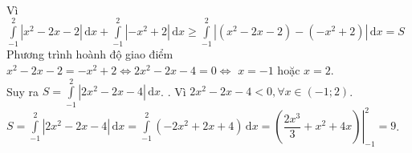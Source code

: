 \begin{ex}
{\begin{itemchoice}
			\\
			Vì $\displaystyle\int\limits_{-1}^{2} \left|x^2 -2x -2\right|\mathrm{\,d}x+
			\displaystyle\int\limits_{-1}^{2} \left|-x^2 + 2\right|\mathrm{\,d}x\ge
			\displaystyle\int\limits_{-1}^{2} \left|(x^2 -2x -2)- (-x^2 + 2) \right|\mathrm{\,d}x=S$
			Phương trình hoành độ giao điểm\\
			$ x^2 -2x -2 = -x^2 +2 \Leftrightarrow
			2x^2 -2x - 4 = 0 \Leftrightarrow $ $x= -1$ hoặc $x=2$.\\
			Suy ra $S= \displaystyle\int\limits_{-1}^{2} \left|2x^2 -2x - 4\right|\mathrm{\,d}x$.
			. 
			Vì $2x^2 -2x - 4<0, \forall x\in (-1;2)$.\\
			$S= \displaystyle\int\limits_{-1}^{2} \left|2x^2 -2x - 4\right|\mathrm{\,d}x=\displaystyle\int\limits_{-1}^{2} (-2x^2 + 2x + 4) \mathrm{\,d}x=\left.\left(\dfrac{2x^3}{3}+x^2+4x\right)\right|_{-1}^{2}= 9$.
		\end{itemchoice}
	}
\end{ex}


